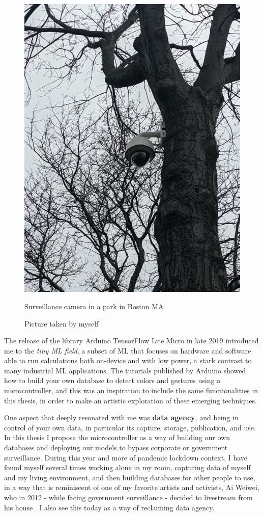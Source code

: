 \begin{figure}[ht]
  \centering
  \includegraphics[width=0.75\linewidth,height=0.30\textheight,keepaspectratio]{images/surveillance-camera-tree.jpg}
  \caption{Surveillance camera in a park in Boston MA}
  \caption*{Picture taken by myself}
  \label{fig:surveillance-camera-tree}
\end{figure}

The release of the library Arduino TensorFlow Lite Micro in late 2019 \cite{google-tensorflow-lite-micro-arduino} introduced me to the \emph{tiny \acrshort{ML} field}, a subset of \acrshort{ML} that focuses on hardware and software able to run calculations both on-device and with low power, a stark contrast to many industrial \acrshort{ML} applications. The tutorials published by Arduino \cite{arduino-tensorflow-fruit-identification} showed how to build your own database to detect colors and gestures using a microcontroller, and this was an inspiration to include the same functionalities in this thesis, in order to make an artistic exploration of these emerging techniques.

One aspect that deeply resonated with me was \textbf{data agency}, and being in control of your own data, in particular its capture, storage, publication, and use. In this thesis I propose the microcontroller as a way of building our own databases and deploying our models to bypass corporate or government surveillance. During this year and more of pandemic lockdown context, I have found myself several times working alone in my room, capturing data of myself and my living environment, and then building databases for other people to use, in a way that is reminiscent of one of my favorite artists and activists, Ai Weiwei, who in 2012 - while facing government surveillance - decided to livestream from his house \cite{website-forbes-ai-weiwei-cam}. I also see this today as a way of reclaiming data agency.

